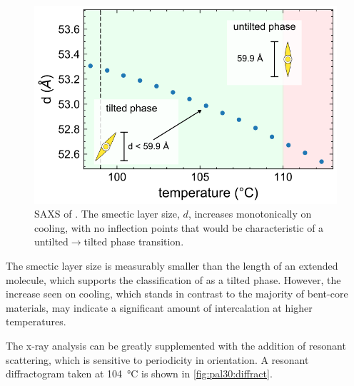 \documentclass[aagreenthesis]{subfiles}
\begin{document}
\begin{figure}[h!]
    \centering
    \includegraphics{figs/pal30/xraysm1/sm2-saxs-annote.png}
    \caption{\label{fig:pal30:saxs} SAXS of \smcpalpha{}. The smectic layer
    size, $d$, increases monotonically on cooling, with no inflection points
that would be characteristic of a untilted$\rightarrow$tilted phase transition.}
\end{figure}

The smectic layer size is measurably smaller than the length of an extended
molecule, which supports the classification of \smcpalpha{} as a tilted phase.
However, the increase seen on cooling, which stands in contrast to the
majority of bent-core materials, may indicate a significant amount of
intercalation at higher temperatures.  

The x-ray analysis can be greatly supplemented with the addition of resonant
scattering, which is sensitive to periodicity in orientation. A resonant diffractogram
taken at \SI{104}{\degreeCelsius} is shown in \autoref{fig:pal30:diffract}.
\end{document}
